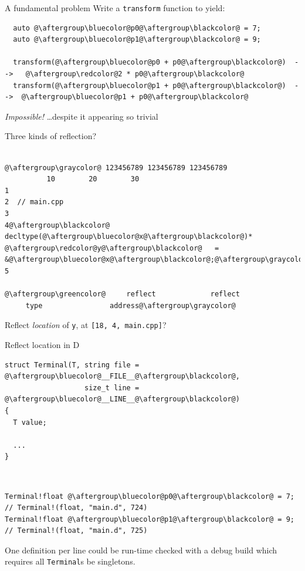 \documentclass[xcolor=dvipsnames]{beamer}
\begin{document}
\begin{frame}[fragile]{A fundamental problem}
Write a \texttt{transform} function to yield:\vspace{10mm}
\begin{lstlisting}
  auto @\aftergroup\bluecolor@p0@\aftergroup\blackcolor@ = 7;
  auto @\aftergroup\bluecolor@p1@\aftergroup\blackcolor@ = 9;

  transform(@\aftergroup\bluecolor@p0 + p0@\aftergroup\blackcolor@)  -->   @\aftergroup\redcolor@2 * p0@\aftergroup\blackcolor@
  transform(@\aftergroup\bluecolor@p1 + p0@\aftergroup\blackcolor@)  -->  @\aftergroup\bluecolor@p1 + p0@\aftergroup\blackcolor@
\end{lstlisting}
\vspace{10mm}
\emph{Impossible!}
\ldots despite it appearing so trivial
\end{frame}


\begin{frame}[fragile]{Three kinds of reflection?}
  \begin{lstlisting}

@\aftergroup\graycolor@ 123456789 123456789 123456789
          10        20        30
1
2  // main.cpp
3
4@\aftergroup\blackcolor@  decltype(@\aftergroup\bluecolor@x@\aftergroup\blackcolor@)*   @\aftergroup\redcolor@y@\aftergroup\blackcolor@   =   &@\aftergroup\bluecolor@x@\aftergroup\blackcolor@;@\aftergroup\graycolor@
5

@\aftergroup\greencolor@     reflect             reflect
     type                address@\aftergroup\graycolor@
  \end{lstlisting}
 \vspace{10mm}
Reflect \emph{location} of {\color{red}\texttt{y}}, at {\color{red}\texttt{[18, 4, main.cpp]}}?
\end{frame}


\begin{frame}[fragile]{Reflect location in D}
\begin{lstlisting}
struct Terminal(T, string file = @\aftergroup\bluecolor@__FILE__@\aftergroup\blackcolor@,
                   size_t line = @\aftergroup\bluecolor@__LINE__@\aftergroup\blackcolor@)
{
  T value;

  ...
}
\end{lstlisting}

~

\begin{lstlisting}
Terminal!float @\aftergroup\bluecolor@p0@\aftergroup\blackcolor@ = 7; // Terminal!(float, "main.d", 724)
Terminal!float @\aftergroup\bluecolor@p1@\aftergroup\blackcolor@ = 9; // Terminal!(float, "main.d", 725)
\end{lstlisting}

\vspace{10mm}
{One definition per line could be run-time checked with a debug build which requires all \texttt{Terminal}s be singletons.}
\end{frame}


\begin{frame}[plain]
  \titlepage
\end{frame}
\end{document}
